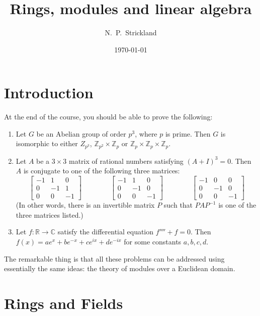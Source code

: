 \documentclass{amsart}
\newcommand{\C}         {{\mathbb{C}}}
\newcommand{\R}         {{\mathbb{R}}}
\newcommand{\Z}         {{\mathbb{Z}}}
\newcommand{\tm}        {\times}
\newcommand{\xra}       {\xrightarrow}
\renewcommand{\:}{\colon}
\theoremstyle{definition}
\begin{document}
\title{Rings, modules and linear algebra}
\author{N.~P.~Strickland}
\date{\today}


\maketitle 

\section{Introduction}
\label{sec-intro} 

At the end of the course, you should be able to prove the following:
\begin{enumerate}
\item Let $G$ be an Abelian group of order $p^3$, where $p$ is prime.
 Then $G$ is isomorphic to either $Z_{p^3}$, $\Z_{p^2}\tm\Z_p$ or
 $\Z_p\tm\Z_p\tm\Z_p$.
\item Let $A$ be a $3\tm 3$ matrix of rational numbers satisfying
 $(A+I)^3=0$.  Then $A$ is conjugate to one of the following three
 matrices: 
 \[ \left[\begin{array}{ccc}
      -1 &  1 &  0 \\  0 & -1 &  1 \\  0 &  0 & -1 
    \end{array}\right] \hspace{4em}
    \left[\begin{array}{ccc}
      -1 &  1 &  0 \\  0 & -1 &  0 \\  0 &  0 & -1 
    \end{array}\right] \hspace{4em}
    \left[\begin{array}{ccc}
      -1 &  0 &  0 \\  0 & -1 &  0 \\  0 &  0 & -1 
    \end{array}\right]
 \]
 (In other words, there is an invertible matrix $P$ such that
 $PAP^{-1}$ is one of the three matrices listed.) 
\item Let $f\:\R\xra{}\C$ satisfy the differential equation
 $f''''+f=0$.  Then $f(x)=a e^x + b e^{-x} + c e^{ix} + d e^{-ix}$ for
 some constants $a,b,c,d$.
\end{enumerate}
The remarkable thing is that all these problems can be addressed using
essentially the same ideas: the theory of modules over a Euclidean
domain. 

\section{Rings and Fields}
\label{sec-rings}
\end{document}
